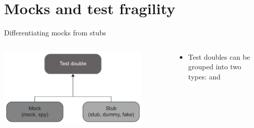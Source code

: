 \documentclass[english,handout,10pt,aspectratio=169,t]{beamer}
\begin{document}
\section{Mocks and test fragility}
\begin{frame}{Differentiating mocks from stubs}
  \begin{columns}[T]
    \begin{column}[]{0.5\textwidth}
      \includegraphics[width=0.85\textwidth]{images/test_doubles.png}
    \end{column}
    \begin{column}[]{0.5\textwidth}
      \begin{itemize}
        \item Test doubles can be grouped into two types:  and 
      \end{itemize}
    \end{column}
  \end{columns}
\end{frame}
\end{document}
